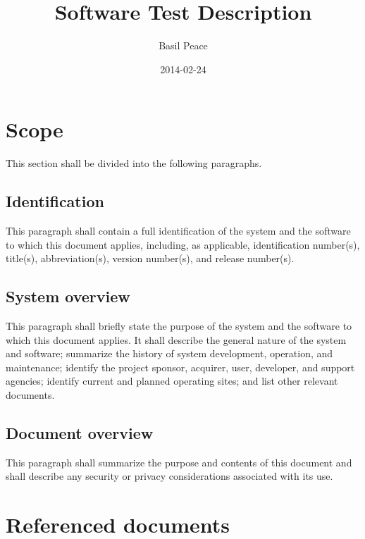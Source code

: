 \documentclass{fidata-report-template}
\begin{document}
\frontmatter

\title{Software Test Description}

\date{2014-02-24}

\author{Basil Peace}

\maketitle
\tableofcontents

\section{Scope}

This section shall be divided into the following paragraphs.

\subsection{Identification}

This paragraph shall contain a full identification of the system and the
software to which this document applies, including, as applicable,
identification number(s), title(s), abbreviation(s), version number(s),
and release number(s).

\subsection{System overview}

This paragraph shall briefly state the purpose of the system and the
software to which this document applies. It shall describe the general
nature of the system and software; summarize the history of system
development, operation, and maintenance; identify the project sponsor,
acquirer, user, developer, and support agencies; identify current and
planned operating sites; and list other relevant documents.

\subsection{Document overview}

This paragraph shall summarize the purpose and contents of this document
and shall describe any security or privacy considerations associated
with its use.

\section{Referenced documents}
\end{document}
